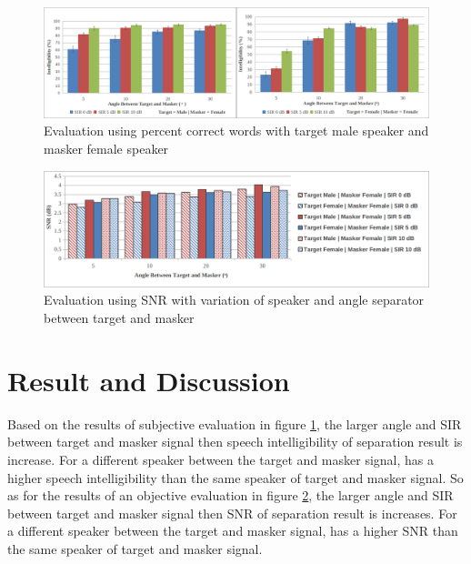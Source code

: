 \documentclass[a4paper]{jpconf}
\begin{document}
\begin{figure}[h]
    \centering
    \includegraphics[width=5.5in]{pict/evaluation_pcw.png}
    \caption{\label{pict:eval_pcw}Evaluation using percent correct words with target male speaker and masker female speaker}
\end{figure} 

\begin{figure}[h]
    \centering
    \includegraphics[width=5.5in]{pict/evaluation_snr.png}
    \caption{\label{pict:eval_snr}Evaluation using SNR with variation of speaker and angle separator between target and masker}
\end{figure} 

\section{Result and Discussion}
Based on the results of subjective evaluation in figure \ref{pict:eval_pcw}, the larger angle and SIR between target and masker signal then speech intelligibility of separation result is increase. For a different speaker between the target and masker signal, has a higher speech intelligibility than the same speaker of target and masker signal. So as for the results of an objective evaluation in figure \ref{pict:eval_snr}, the larger angle and SIR between target and masker signal then SNR of separation result is increases. For a different speaker between the target and masker signal, has a higher SNR than the same speaker of target and masker signal.
\end{document}
